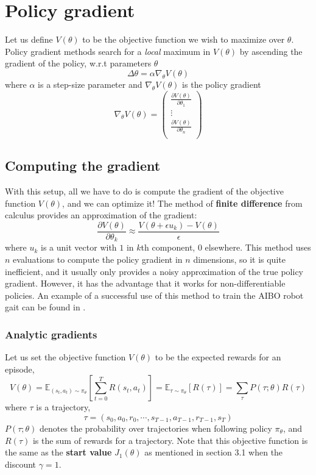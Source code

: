 \documentclass{article}
\newcommand{\E}{\mathbb{E}}                                        %
\begin{document}
\section{Policy gradient}
Let us define $V(\theta)$ to be the objective function we wish to maximize over $\theta$. Policy gradient methods search for a \emph{local} maximum in $V(\theta)$ by ascending the gradient of the policy, w.r.t parameters $\theta$
\[ \Delta \theta = \alpha \nabla_\theta V(\theta) \]
where $\alpha$ is a step-size parameter and $\nabla_\theta V(\theta)$ is the policy gradient
\[
\nabla_\theta V(\theta) = \begin{pmatrix}
    \frac{\partial V(\theta)}{\partial \theta_1} \\
    \vdots \\
    \frac{\partial V(\theta)}{\partial \theta_n} \\
\end{pmatrix} \]

\subsection{Computing the gradient}
With this setup, all we have to do is compute the gradient of the objective function $V(\theta)$, and we can optimize it! The method of \textbf{finite difference} from calculus provides an approximation of the gradient:
\[ \frac{\partial V(\theta)}{\partial \theta_k} \approx \frac{V(\theta + \epsilon u_k) - V(\theta)}{\epsilon} \]
where $u_k$ is a unit vector with $1$ in $k$th component, $0$ elsewhere. This method uses $n$ evaluations to compute the policy gradient in $n$ dimensions, so it is quite inefficient, and it usually only provides a noisy approximation of the true policy gradient. However, it has the advantage that it works for non-differentiable policies. An example of a successful use of this method to train the AIBO robot gait can be found in \cite{AIBO}.

\subsubsection{Analytic gradients}
Let us set the objective function $V(\theta)$ to be the expected rewards for an episode,
\[
    V(\theta)
    = \E_{(s_t, a_t) \sim \pi_\theta} \left[ \sum_{t=0}^T R(s_t, a_t) \right]
    = \E_{\tau \sim \pi_\theta} \left[ R(\tau) \right]
    = \sum_\tau P(\tau; \theta) R(\tau)
\]
where $\tau$ is a trajectory,
\[ \tau = (s_0, a_0, r_0, \cdots, s_{T-1}, a_{T-1}, r_{T-1}, s_T) \]
$P(\tau; \theta)$ denotes the probability over trajectories when following policy $\pi_\theta$, and $R(\tau)$ is the sum of rewards for a trajectory. Note that this objective function is the same as the \textbf{start value} $J_1(\theta)$ as mentioned in section 3.1 when the discount $\gamma = 1$.
\end{document}
